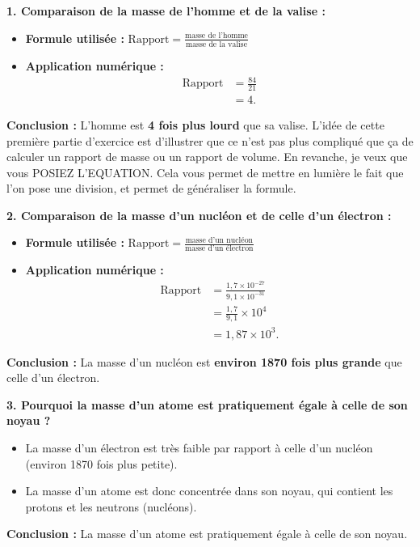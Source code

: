\documentclass[answers]{exam}
\begin{document}
\begin{solution}
  \textbf{1. Comparaison de la masse de l'homme et de la valise :}
  \begin{itemize}
    \item \textbf{Formule utilisée :} \( \text{Rapport} = \frac{\text{masse de l'homme}}{\text{masse de la valise}} \)
    \item \textbf{Application numérique :}
    \begin{align*}
      \text{Rapport} &= \frac{84}{21} \\
      &= 4.
    \end{align*}
  \end{itemize}
  \textbf{Conclusion :} L'homme est \textbf{4 fois plus lourd} que sa valise. L'idée de cette première partie d'exercice est d'illustrer que ce n'est pas plus compliqué que ça de calculer un rapport de masse ou un rapport de volume. En revanche, je veux que vous POSIEZ L'EQUATION. Cela vous permet de mettre en lumière le fait que l'on pose une division, et permet de généraliser la formule. \par
\vspace{1em}
  \textbf{2. Comparaison de la masse d'un nucléon et de celle d'un électron :}
  \begin{itemize}
    \item \textbf{Formule utilisée :} \( \text{Rapport} = \frac{\text{masse d'un nucléon}}{\text{masse d'un électron}} \)
    \item \textbf{Application numérique :}
    \begin{align*}
      \text{Rapport} &= \frac{1,7 \times 10^{-27}}{9,1 \times 10^{-31}} \\
      &= \frac{1,7}{9,1} \times 10^{4} \\
      &= 1,87 \times 10^{3}.
    \end{align*}
  \end{itemize}
  \textbf{Conclusion :} La masse d'un nucléon est \textbf{environ 1870 fois plus grande} que celle d'un électron. \par
  \vspace{1em}
  \textbf{3. Pourquoi la masse d'un atome est pratiquement égale à celle de son noyau ?}
  \begin{itemize}[noitemsep]
    \item La masse d'un électron est très faible par rapport à celle d'un nucléon (environ 1870 fois plus petite).
    \item La masse d'un atome est donc concentrée dans son noyau, qui contient les protons et les neutrons (nucléons).
  \end{itemize}
  \textbf{Conclusion :} La masse d'un atome est pratiquement égale à celle de son noyau.
\end{solution}
\end{document}
